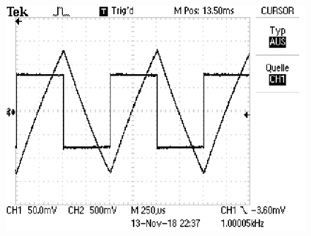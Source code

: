 \begin{figure}
  \centering
  \includegraphics{build/integrator3.pdf}
  \label{fig:plot}
\end{figure}